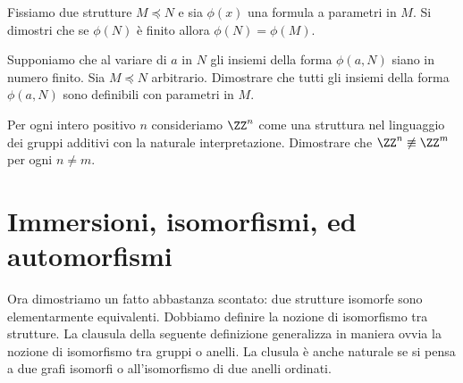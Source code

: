 \begin{exercise}
Fissiamo due strutture $M\preceq N$ e sia $\phi(x)$ una formula a parametri in $M$. Si dimostri che se $\phi(N)$ \`e finito allora $\phi(N)=\phi(M)$.\QED
\end{exercise}

\begin{exercise}
Supponiamo che al variare di $a$ in $N$ gli insiemi della forma $\phi(a,N)$ siano in numero finito. Sia $M\preceq N$ arbitrario. Dimostrare che tutti gli insiemi della forma $\phi(a,N)$ sono definibili con parametri in $M$.\QED
\end{exercise}

\begin{exercise}
Per ogni intero positivo $n$ consideriamo $\ZZ^n$ come una struttura nel linguaggio dei gruppi additivi con la naturale interpretazione. Dimostrare che $\ZZ^n\not\equiv\ZZ^m$ per ogni $n\neq m$.%
\end{exercise}
















\section{Immersioni, isomorfismi, ed automorfismi}


\def\ceq#1#2#3{\hspace*{8ex}\llap{#1}\parbox{5ex}{\hfil#2}\rlap{#3,}\hspace{11ex}}



Ora dimostriamo un fatto abbastanza scontato: due strutture isomorfe sono elementarmente equivalenti. Dobbiamo definire la nozione di isomorfismo tra strutture. La clausula  della seguente definizione generalizza in maniera ovvia la nozione di isomorfismo tra gruppi o anelli. La clusula  \`e anche naturale se si pensa a due grafi isomorfi o all'isomorfismo di due anelli ordinati.

